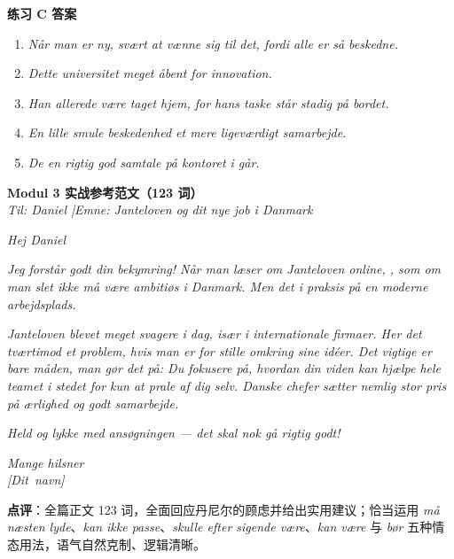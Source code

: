 \begin{answerbox}
\textbf{练习 C 答案}
\begin{enumerate}
  \item \textit{Når man er ny,  svært at vænne sig til det, fordi alle er så beskedne.}
  \item \textit{Dette universitet  meget åbent for innovation.}
  \item \textit{Han  allerede være taget hjem, for hans taske står stadig på bordet.}
  \item \textit{En lille smule beskedenhed  et mere ligeværdigt samarbejde.}
  \item \textit{De  en rigtig god samtale på kontoret i går.}
\end{enumerate}

\textbf{Modul 3 实战参考范文（123 词）}\\
\textit{Til: Daniel \quad|\quad Emne: Janteloven og dit nye job i Danmark}

\textit{Hej Daniel}

\textit{Jeg forstår godt din bekymring! Når man læser om Janteloven online, , som om man slet ikke må være ambitiøs i Danmark. Men det  i praksis på en moderne arbejdsplads.}

\textit{Janteloven  blevet meget svagere i dag, især i internationale firmaer. Her  det tværtimod  et problem, hvis man er for stille omkring sine idéer. Det vigtige er bare måden, man gør det på: Du  fokusere på, hvordan din viden kan hjælpe hele teamet i stedet for kun at prale af dig selv. Danske chefer sætter nemlig stor pris på ærlighed og godt samarbejde.}

\textit{Held og lykke med ansøgningen --- det skal nok gå rigtig godt!}

\textit{Mange hilsner\\
\mbox{[Dit navn]}}

\small\textbf{点评}：全篇正文 123 词，全面回应丹尼尔的顾虑并给出实用建议；恰当运用 \textit{må næsten lyde}、\textit{kan ikke passe}、\textit{skulle efter sigende være}、\textit{kan være} 与 \textit{bør} 五种情态用法，语气自然克制、逻辑清晰。
\end{answerbox}
